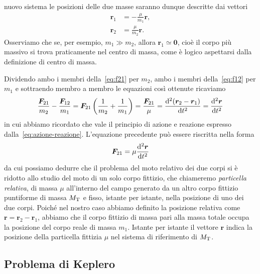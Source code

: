 nuovo sistema le posizioni delle due masse saranno dunque descritte dai vettori
\begin{subequations}
  \label{eq:r1-r2-nel-cdm}
  \begin{align}
    \bm{r}_1 &= -\frac{\mu}{m_1}\bm{r}, \label{eq:r1-nel-cdm}\\
    \bm{r}_2 &= \frac{\mu}{m_2}\bm{r}.
  \end{align}
\end{subequations}
Osserviamo che se, per esempio, $m_1\gg m_2$, allora $\bm{r}_1\simeq\bm{0}$,
cioè il corpo più massivo si trova praticamente nel centro di massa, come è
logico aspettarsi dalla definizione di centro di massa.

Dividendo ambo i membri della~\eqref{eq:f21} per $m_2$, ambo i membri
della~\eqref{eq:f12} per $m_1$ e sottraendo membro a membro le equazioni così
ottenute ricaviamo
\begin{equation}
  \frac{\bm{F}_{21}}{m_2}-\frac{\bm{F}_{12}}{m_1} = \bm{F}_{21}
  \left(
    \frac{1}{m_2}+\frac{1}{m_1}
  \right) = \frac{\bm{F}_{21}}{\mu} = \toder[2]{(\bm{r}_2-\bm{r}_1)}{t} =
  \toder[2]{\bm{r}}{t}
\end{equation}
in cui abbiamo ricordato che vale il principio di azione e reazione espresso
dalla~\eqref{eq:azione-reazione}. L'equazione precedente può essere riscritta
nella forma
\begin{equation}
  \label{eq:f21-mu}
  \bm{F}_{21}=\mu\toder[2]{\bm{r}}{t}
\end{equation}
da cui possiamo dedurre che il problema del moto relativo dei due corpi si è
ridotto allo studio del moto di un solo corpo fittizio, che chiameremo
\emph{particella relativa}, di massa $\mu$ all'interno del campo generato da un
altro corpo fittizio puntiforme di massa $M_\textup{T}$ e fisso, istante per
istante, nella posizione di uno dei due corpi. Poiché nel nostro caso abbiamo
definito la posizione relativa come $\bm{r}=\bm{r}_2 - \bm{r}_1$, abbiamo che il
corpo fittizio di massa pari alla massa totale occupa la posizione del corpo
reale di massa $m_1$. Istante per istante il vettore $\bm{r}$ indica la
posizione della particella fittizia $\mu$ nel sistema di riferimento di
$M_\textup{T}$.

\subsection{Problema di Keplero}
\label{sec:problema-keplero}

